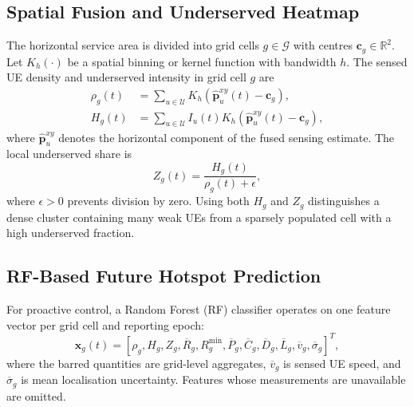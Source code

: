 \subsection{Spatial Fusion and Underserved Heatmap}

The horizontal service area is divided into grid cells
$g\in\mathcal{G}$ with centres $\mathbf{c}_g\in\mathbb{R}^2$. Let
$K_h(\cdot)$ be a spatial binning or kernel function with bandwidth
$h$. The sensed UE density and underserved intensity in grid cell
$g$ are
\begin{align}
 \rho_g(t)&=\sum_{u\in\mathcal{U}}
 K_h\!\left(\widehat{\mathbf{p}}_u^{xy}(t)-\mathbf{c}_g\right),
 \label{eq:sensed-density}\\
 H_g(t)&=\sum_{u\in\mathcal{U}} I_u(t)
 K_h\!\left(\widehat{\mathbf{p}}_u^{xy}(t)-\mathbf{c}_g\right),
 \label{eq:underserved-intensity}
\end{align}
where $\widehat{\mathbf{p}}_u^{xy}$ denotes the horizontal component
of the fused sensing estimate. The local underserved share is
\begin{equation}
 Z_g(t)=\frac{H_g(t)}{\rho_g(t)+\epsilon},
 \label{eq:underserved-share}
\end{equation}
where $\epsilon>0$ prevents division by zero. Using both $H_g$ and
$Z_g$ distinguishes a dense cluster containing many weak UEs from a
sparsely populated cell with a high underserved fraction.

\subsection{RF-Based Future Hotspot Prediction}

For proactive control, a Random Forest (RF) classifier operates on
one feature vector per grid cell and reporting epoch:
\begin{equation}
 \mathbf{x}_g(t)=
 [\rho_g,H_g,Z_g,\overline{R}_g,R_g^{\min},
 \overline{P}_g,\overline{C}_g,\overline{D}_g,
 \overline{L}_g,\overline{v}_g,\overline{\sigma}_g]^{T},
 \label{eq:rf-features}
\end{equation}
where the barred quantities are grid-level aggregates,
$\overline{v}_g$ is sensed UE speed, and
$\overline{\sigma}_g$ is mean localisation uncertainty. Features
whose measurements are unavailable are omitted.

